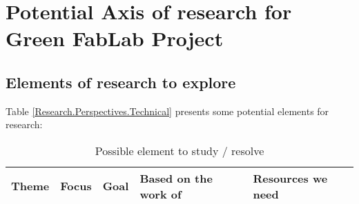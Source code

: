 \chapter{Potential Axis of research for Green FabLab Project}

\section{Elements of research to explore}

\begin{small}
	
	Table \ref{Research.Perspectives.Technical} presents some potential elements	for research:
	
	
	\begin{longtabu} to \linewidth [H] { X[0.5,l]  X[0.5,l]  X[1.4, l]  X[0.5, l]   X[1,l]   }
		
		\caption{Possible element to study / resolve} \\
		
		\toprule
		\textbf{Theme}	& \textbf{Focus} & \textbf{Goal} & \textbf{Based on the work of} & \textbf{Resources we need}  \\ 		
		\midrule
		\endfirsthead
		
		
		

\end{longtabu}
\end{small}
